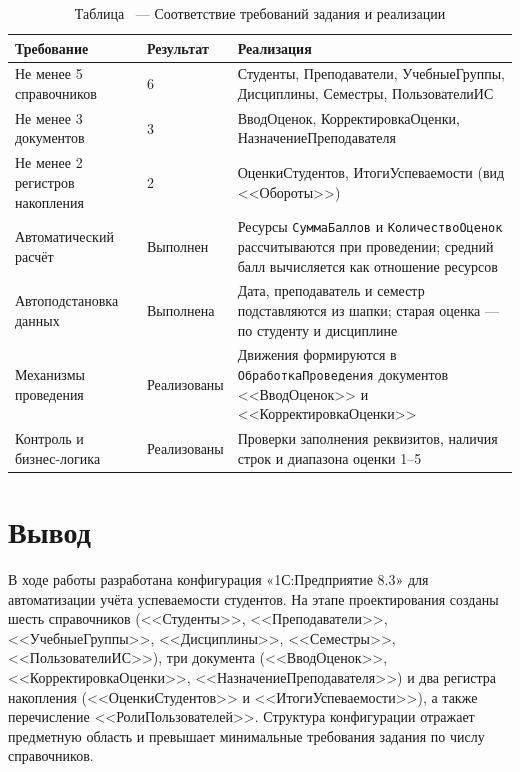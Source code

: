 \documentclass[14pt,a4paper]{extarticle}
\begin{document}
\begin{table}[H]
    \centering
    \caption{Таблица \thetable\ --- Соответствие требований задания и реализации}
    \label{tab:requirements}
    \footnotesize
    \begin{tabularx}{\textwidth}{@{}>{\raggedright\arraybackslash}X l >{\raggedright\arraybackslash}X@{}}
        \toprule
        Требование & Результат & Реализация \\
        \midrule
        Не менее 5 справочников & 6 & Студенты, Преподаватели,
        УчебныеГруппы, Дисциплины, Семестры, ПользователиИС \\
        Не менее 3 документов & 3 & ВводОценок, КорректировкаОценки,
        НазначениеПреподавателя \\
        Не менее 2 регистров накопления & 2 & ОценкиСтудентов,
        ИтогиУспеваемости (вид <<Обороты>>) \\
        Автоматический расчёт & Выполнен & Ресурсы \texttt{СуммаБаллов} и
        \texttt{КоличествоОценок} рассчитываются при проведении; средний балл
        вычисляется как отношение ресурсов \\
        Автоподстановка данных & Выполнена & Дата, преподаватель и семестр
        подставляются из шапки; старая оценка --- по студенту и дисциплине \\
        Механизмы проведения & Реализованы & Движения формируются в
        \texttt{ОбработкаПроведения} документов <<ВводОценок>> и
        <<КорректировкаОценки>> \\
        Контроль и бизнес-логика & Реализованы & Проверки заполнения
        реквизитов, наличия строк и диапазона оценки 1--5 \\
        \bottomrule
    \end{tabularx}
    \addtocounter{table}{-1}
\end{table}

\section{Вывод}

В ходе работы разработана конфигурация «1С:Предприятие 8.3» для автоматизации
учёта успеваемости студентов. На этапе проектирования созданы шесть
справочников (<<Студенты>>, <<Преподаватели>>, <<УчебныеГруппы>>,
<<Дисциплины>>, <<Семестры>>, <<ПользователиИС>>), три документа
(<<ВводОценок>>, <<КорректировкаОценки>>, <<НазначениеПреподавателя>>) и два
регистра накопления (<<ОценкиСтудентов>> и <<ИтогиУспеваемости>>), а также
перечисление <<РолиПользователей>>. Структура конфигурации отражает предметную
область и превышает минимальные требования задания по числу справочников.
\end{document}
